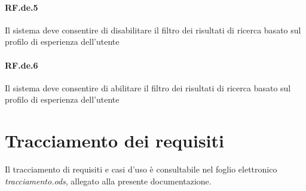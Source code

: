 \documentclass[10pt,a4paper,headinclude,footinclude,hidelinks]{scrreprt} %
\begin{document}
	\paragraph{RF.de.5} Il sistema deve consentire di disabilitare il filtro dei risultati di ricerca basato sul profilo di esperienza dell'utente

	\paragraph{RF.de.6} Il sistema deve consentire di abilitare il filtro dei risultati di ricerca basato sul profilo di esperienza dell'utente

	\section{Tracciamento dei requisiti}
	\label{ch:stage:ar:requisiti:matrice}
	Il tracciamento di requisiti e casi d'uso è consultabile nel foglio elettronico \textit{tracciamento.ods}, allegato alla presente documentazione.
\end{document}
